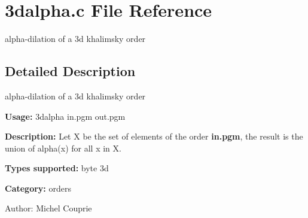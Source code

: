\section{3dalpha.c File Reference}
\label{3dalpha_8c}
alpha-dilation of a 3d khalimsky order  




\label{_details}
\subsection{Detailed Description}
alpha-dilation of a 3d khalimsky order 

{\bf Usage:} 3dalpha in.pgm out.pgm

{\bf Description:} Let X be the set of elements of the order {\bf in.pgm}, the result is the union of alpha(x) for all x in X.

{\bf Types supported:} byte 3d

{\bf Category:} orders

\begin{Desc}
\item[Author:]Michel Couprie \end{Desc}
